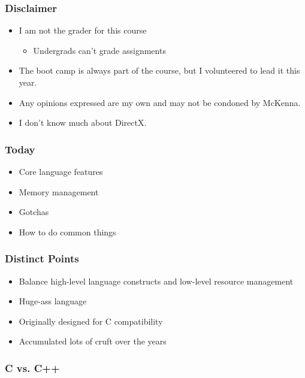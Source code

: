 \documentclass[glossy]{beamer}
\begin{document}
\begin{frame}[fragile=singleslide]
\frametitle{Disclaimer}
  \begin{itemize}
    \item I am not the grader for this course
    \begin{itemize}
      \item Undergrads can't grade assignments
    \end{itemize}
    \item The boot camp is always part of the course, but I volunteered to lead it this year.
    \item Any opinions expressed are my own and may not be condoned by McKenna.
    \item I don't know much about DirectX.
  \end{itemize}
\end{frame}

\begin{frame}[fragile=singleslide]
  \frametitle{Today}
  \begin{itemize}
    \item Core language features
    \item Memory management
    \item Gotchas
    \item How to do common things
  \end{itemize}
\end{frame}

\begin{frame}[fragile=singleslide]
  \frametitle{Distinct Points}
  \begin{itemize}
    \item Balance high-level language constructs and low-level resource management
    \item Huge-ass language
    \item Originally designed for C compatibility
    \item Accumulated lots of cruft over the years
  \end{itemize}
\end{frame}

\begin{frame}[fragile=singleslide]
  \frametitle{C vs. C++}
\end{frame}
\end{document}

